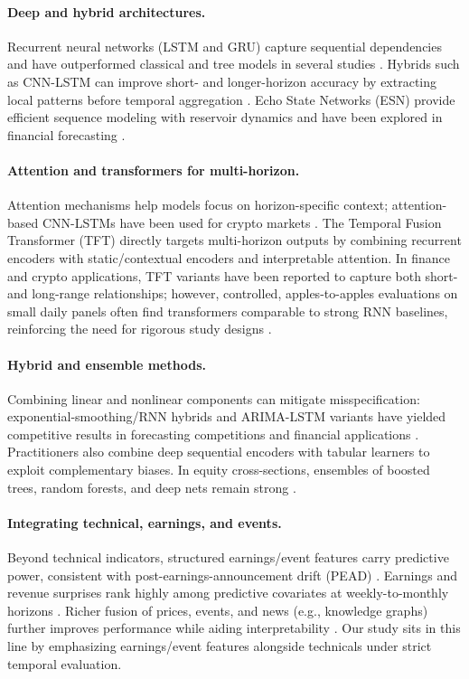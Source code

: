 \documentclass[10pt,twocolumn]{article}
\begin{document}
\paragraph{Deep and hybrid architectures.} Recurrent neural networks (LSTM and GRU) capture sequential dependencies and have outperformed classical and tree models in several studies \citep{hochreiter1997long,cho2014learning,fischer2018,selvin2017}. Hybrids such as CNN-LSTM can improve short- and longer-horizon accuracy by extracting local patterns before temporal aggregation \citep{selvin2017}. Echo State Networks (ESN) provide efficient sequence modeling with reservoir dynamics and have been explored in financial forecasting \citep{jaeger2001esn}.

\paragraph{Attention and transformers for multi-horizon.} Attention mechanisms help models focus on horizon-specific context; attention-based CNN-LSTMs have been used for crypto markets \citep{xu2022bitcoin}. The Temporal Fusion Transformer (TFT) \citep{lim2021temporal} directly targets multi-horizon outputs by combining recurrent encoders with static/contextual encoders and interpretable attention. In finance and crypto applications, TFT variants have been reported to capture both short- and long-range relationships; however, controlled, apples-to-apples evaluations on small daily panels often find transformers comparable to strong RNN baselines, reinforcing the need for rigorous study designs \citep{zhang2023review}.

\paragraph{Hybrid and ensemble methods.} Combining linear and nonlinear components can mitigate misspecification: exponential-smoothing/RNN hybrids and ARIMA-LSTM variants have yielded competitive results in forecasting competitions and financial applications \citep{smyl2020}. Practitioners also combine deep sequential encoders with tabular learners to exploit complementary biases. In equity cross-sections, ensembles of boosted trees, random forests, and deep nets remain strong \citep{krauss2017}.

\paragraph{Integrating technical, earnings, and events.} Beyond technical indicators, structured earnings/event features carry predictive power, consistent with post-earnings-announcement drift (PEAD) \citep{bernard1989}. Earnings and revenue surprises rank highly among predictive covariates at weekly-to-monthly horizons \citep{schnaubelt2020}. Richer fusion of prices, events, and news (e.g., knowledge graphs) further improves performance while aiding interpretability \citep{cheng2022}. Our study sits in this line by emphasizing earnings/event features alongside technicals under strict temporal evaluation.
\end{document}
